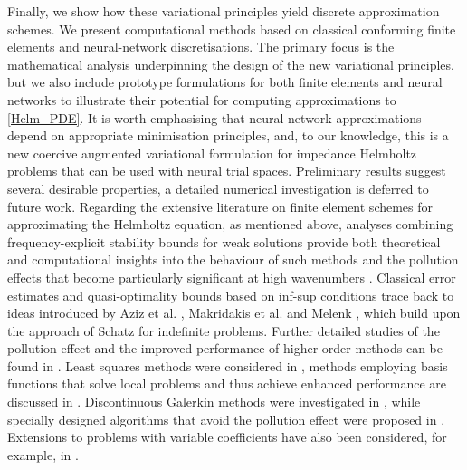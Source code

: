 \documentclass[twoside,11pt]{article}
\begin{document}
 {Finally, we show how these variational principles yield discrete approximation schemes. We present %
  computational methods based on classical conforming finite elements and neural-network discretisations. The primary focus is the mathematical analysis underpinning the design of the new variational principles, but we also include prototype formulations for both finite elements and neural networks to illustrate their potential for computing approximations to \eqref{Helm_PDE}.    It is worth emphasising that neural network approximations depend on appropriate minimisation principles, and, to our knowledge, this is a new coercive augmented variational formulation for impedance Helmholtz problems that can be used with neural trial spaces. Preliminary results suggest several desirable properties, a detailed numerical investigation is deferred to future work. }
Regarding the extensive literature on finite element schemes for approximating the Helmholtz equation, as mentioned above, analyses combining frequency-explicit stability bounds for weak solutions provide both theoretical and computational insights into the behaviour of such methods and the pollution effects that become particularly significant at high {wavenumbers} \cite{BabuskaSauter2000}. Classical error estimates and quasi-optimality bounds based on inf-sup conditions trace back to ideas introduced by Aziz et al. \cite{Aziz_et_al_1988}, Makridakis et al. \cite{Makridakis_et_al_1996} and Melenk \cite{Melenk1995}, which build upon the approach of Schatz \cite{Schatz1974} for indefinite problems.
Further detailed studies of the pollution effect and the improved performance of higher-order methods can be found in \cite{Sauter_refined, MelenkSauter2010}.  {Least squares methods were considered in \cite{First-orderLS_Helm_Lee_et_al_2000}, methods employing basis functions that solve local problems and thus achieve enhanced performance are discussed in \cite{HipMP_serveyT_2016}.} Discontinuous Galerkin methods were investigated in \cite{Feng_dg_2011}, while specially designed algorithms that avoid the pollution effect were proposed in \cite{Peterseim_polloutionHelm_2017}. Extensions to problems with variable coefficients have also been considered, for example, in \cite{GrahamSauter2020}.
  
\end{document}
